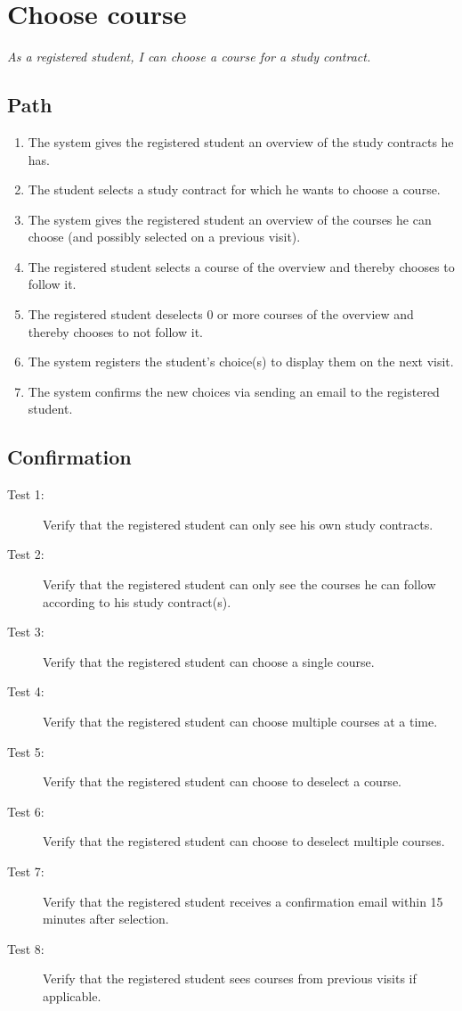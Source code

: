 \section{Choose course}

\par \emph{As a registered student, I can choose a course for a study contract.}

\subsection{Path}

\begin{enumerate}
  \item The system gives the registered student an overview of the study
  contracts he has.
  \item The student selects a study contract for which he wants to choose a
  course.
  \item The system gives the registered student an overview of the courses he
  can choose (and possibly selected on a previous visit).
  \item The registered student selects a course of the overview and thereby
  chooses to follow it.
  \item The registered student deselects 0 or more courses of the overview and
  thereby chooses to not follow it.
  \item The system registers the student's choice(s) to display them on the next
  visit.
  \item The system confirms the new choices via sending an email to the
  registered student. 
\end{enumerate}

\subsection{Confirmation}

\begin{description}
\item[Test 1:] Verify that the registered student can only see his own study
contracts.
\item[Test 2:] Verify that the registered student can only see the courses he
can follow according to his study contract(s).
\item[Test 3:] Verify that the registered student can choose a single course.
\item[Test 4:] Verify that the registered student can choose multiple courses at
a time.
\item[Test 5:] Verify that the registered student can choose to deselect a
course.
\item[Test 6:] Verify that the registered student can choose to deselect
multiple courses.
\item[Test 7:] Verify that the registered student receives a confirmation email
within 15 minutes after selection.
\item[Test 8:] Verify that the registered student sees courses from previous
visits if applicable.
\end{description}
